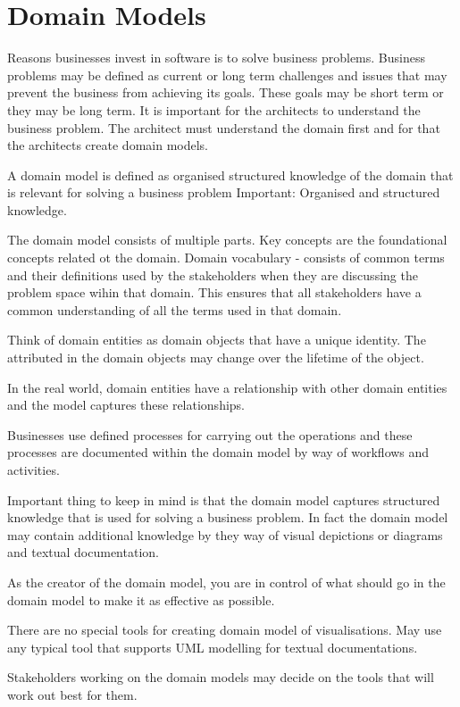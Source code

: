 \section{Domain Models}
Reasons businesses invest in software is to solve business problems.
Business problems may be defined as current or long term challenges and issues that may prevent the business from achieving its goals.
These goals may be short term or they may be long term.
It is important for the architects to understand the business problem.
The architect must understand the domain first and for that the architects create domain models.


A domain model is defined as organised structured knowledge of the domain that is relevant for solving a business problem
Important: Organised and structured knowledge.

The domain model consists of multiple parts.
Key concepts are the foundational concepts related ot the domain.
Domain vocabulary - consists of common terms and their definitions used by the stakeholders when they are discussing the problem space wihin that domain.
This ensures that all stakeholders have a common understanding of all the terms used in that domain.

Think of domain entities as domain objects that have a unique identity.
The attributed in the domain objects may change over the lifetime of the object.

In the real world, domain entities have a relationship with other domain entities and the model captures these relationships.

Businesses use defined processes for carrying out the operations and these processes are documented within the domain model by way of workflows and activities.

Important thing to keep in mind is that the domain model captures structured knowledge that is used for solving a business problem.
In fact the domain model may contain additional knowledge by they way of visual depictions or diagrams and textual documentation.

As the creator of the domain model, you are in control of what should go in the domain model to make it as effective as possible.

There are no special tools for creating domain model of visualisations.
May use any typical tool that supports UML modelling for textual documentations.

Stakeholders working on the domain models may decide on the tools that will work out best for them.

